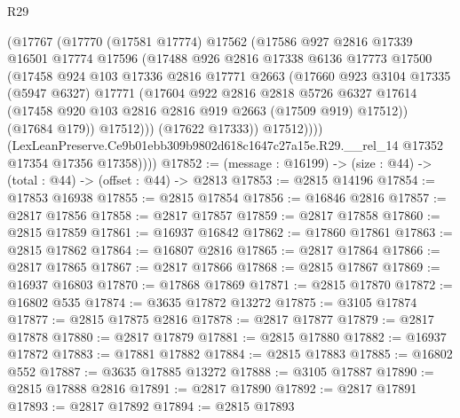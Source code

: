 \begin{lexlean}{R29}
\begin{coremodule}
                (@17767
                  (@17770
                    (@17581 @17774)
                    @17562
                    (@17586
                      @927
                      @2816
                      @17339
                      @16501
                      @17774
                      @17596
                      (@17488
                        @926
                        @2816
                        @17338
                        @6136
                        @17773
                        @17500
                        (@17458
                          @924
                          @103
                          @17336
                          @2816
                          @17771
                          @2663
                          (@17660
                            @923
                            @3104
                            @17335
                            (@5947 @6327)
                            @17771
                            (@17604
                              @922
                              @2816
                              @2818
                              @5726
                              @6327
                              @17614
                              (@17458 @920 @103 @2816 @2816 @919 @2663 (@17509 @919) @17512))
                            (@17684 @179))
                          @17512)))
                    (@17622 @17333))
                  @17512))))
          (LexLeanPreserve.Ce9b01ebb309b9802d618c1647c27a15e.R29.__rel_14
            @17352
            @17354
            @17356
            @17358))))
@17852 := (message : @16199) -> (size : @44) -> (total : @44) -> (offset : @44) -> @2813
@17853 := @2815 @14196
@17854 := @17853 @16938
@17855 := @2815 @17854
@17856 := @16846 @2816
@17857 := @2817 @17856
@17858 := @2817 @17857
@17859 := @2817 @17858
@17860 := @2815 @17859
@17861 := @16937 @16842
@17862 := @17860 @17861
@17863 := @2815 @17862
@17864 := @16807 @2816
@17865 := @2817 @17864
@17866 := @2817 @17865
@17867 := @2817 @17866
@17868 := @2815 @17867
@17869 := @16937 @16803
@17870 := @17868 @17869
@17871 := @2815 @17870
@17872 := @16802 @535
@17874 := @3635 @17872 @13272
@17875 := @3105 @17874
@17877 := @2815 @17875 @2816
@17878 := @2817 @17877
@17879 := @2817 @17878
@17880 := @2817 @17879
@17881 := @2815 @17880
@17882 := @16937 @17872
@17883 := @17881 @17882
@17884 := @2815 @17883
@17885 := @16802 @552
@17887 := @3635 @17885 @13272
@17888 := @3105 @17887
@17890 := @2815 @17888 @2816
@17891 := @2817 @17890
@17892 := @2817 @17891
@17893 := @2817 @17892
@17894 := @2815 @17893

\end{coremodule}
\end{lexlean}
